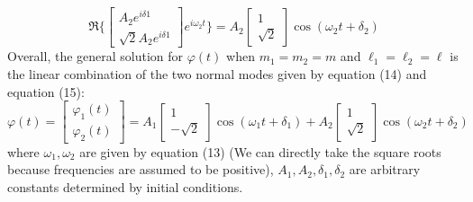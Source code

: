 \documentclass[11pt]{article}
\begin{document}
\begin{equation}
  \Re\{
  \begin{bmatrix}
    A_2e^{i\delta 1}\\
    \sqrt{2}A_2 e^{i\delta 1}
  \end{bmatrix}
  e^{i\omega_2 t} \}
  =A_2
  \begin{bmatrix}
    1 \\
    \sqrt{2}
  \end{bmatrix}
  \cos(\omega_2 t +\delta_2)
\end{equation}
Overall, the general solution for \(\varphi(t)\) when \(m_1=m_2=m\) and \(\ell_1=\ell_2=\ell\) is the linear combination of the two normal modes given by equation (14) and equation (15):
\begin{equation}
  \varphi(t)
  =
  \begin{bmatrix}
    \varphi_1(t)\\
    \varphi_2(t)
  \end{bmatrix}
  =
  A_1
  \begin{bmatrix}
    1 \\
    -\sqrt{2}
  \end{bmatrix}
  \cos(\omega_1 t +\delta_1)
  +
  A_2
  \begin{bmatrix}
    1 \\
    \sqrt{2}
  \end{bmatrix}
  \cos(\omega_2 t +\delta_2)
\end{equation}
where \(\omega_1, \omega_2\) are given by equation (13) (We can directly take the square roots because frequencies are assumed to be positive), \(A_1, A_2, \delta_1, \delta_2\) are arbitrary constants determined
by initial conditions.\\
\end{document}
